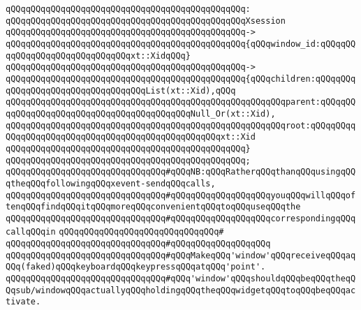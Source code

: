 \verb|qQQqqQQqqQQqqQQqqQQqqQQqqQQqqQQqqQQqqQQqqQQqqQQq:|\newline
\verb|qQQqqQQqqQQqqQQqqQQqqQQqqQQqqQQqqQQqqQQqqQQqqQQqXsession|\newline
\verb|qQQqqQQqqQQqqQQqqQQqqQQqqQQqqQQqqQQqqQQqqQQqqQQq->|\newline
\verb|qQQqqQQqqQQqqQQqqQQqqQQqqQQqqQQqqQQqqQQqqQQqqQQq{qQQqwindow_id:qQQqqQQqqQQqqQQqqQQqqQQqqQQqqQQqxt::XidqQQq}|\newline
\verb|qQQqqQQqqQQqqQQqqQQqqQQqqQQqqQQqqQQqqQQqqQQqqQQq->|\newline
\verb|qQQqqQQqqQQqqQQqqQQqqQQqqQQqqQQqqQQqqQQqqQQqqQQq{qQQqchildren:qQQqqQQqqQQqqQQqqQQqqQQqqQQqqQQqqQQqList(xt::Xid),qQQq|\newline
\verb|qQQqqQQqqQQqqQQqqQQqqQQqqQQqqQQqqQQqqQQqqQQqqQQqqQQqqQQqparent:qQQqqQQqqQQqqQQqqQQqqQQqqQQqqQQqqQQqqQQqqQQqNull_Or(xt::Xid),|\newline
\verb|qQQqqQQqqQQqqQQqqQQqqQQqqQQqqQQqqQQqqQQqqQQqqQQqqQQqqQQqroot:qQQqqQQqqQQqqQQqqQQqqQQqqQQqqQQqqQQqqQQqqQQqqQQqqQQqxt::Xid|\newline
\verb|qQQqqQQqqQQqqQQqqQQqqQQqqQQqqQQqqQQqqQQqqQQqqQQq}|\newline
\verb|qQQqqQQqqQQqqQQqqQQqqQQqqQQqqQQqqQQqqQQqqQQqqQQq;|\newline
\newline
\newline
\verb|qQQqqQQqqQQqqQQqqQQqqQQqqQQqqQQq#qQQqNB:qQQqRatherqQQqthanqQQqusingqQQqtheqQQqfollowingqQQqxevent-sendqQQqcalls,|\newline
\verb|qQQqqQQqqQQqqQQqqQQqqQQqqQQqqQQq#qQQqqQQqqQQqqQQqqQQqyouqQQqwillqQQqoftenqQQqfindqQQqitqQQqmoreqQQqconvenientqQQqtoqQQquseqQQqthe|\newline
\verb|qQQqqQQqqQQqqQQqqQQqqQQqqQQqqQQq#qQQqqQQqqQQqqQQqqQQqcorrespondingqQQqcallqQQqin|\newline
\verb|qQQqqQQqqQQqqQQqqQQqqQQqqQQqqQQq#|\newline
\verb|qQQqqQQqqQQqqQQqqQQqqQQqqQQqqQQq#qQQqqQQqqQQqqQQqqQQq|\newline
\newline
\newline
\verb|qQQqqQQqqQQqqQQqqQQqqQQqqQQqqQQq#qQQqMakeqQQq'window'qQQqreceiveqQQqaqQQq(faked)qQQqkeyboardqQQqkeypressqQQqatqQQq'point'.|\newline
\verb|qQQqqQQqqQQqqQQqqQQqqQQqqQQqqQQq#qQQq'window'qQQqshouldqQQqbeqQQqtheqQQqsub/windowqQQqactuallyqQQqholdingqQQqtheqQQqwidgetqQQqtoqQQqbeqQQqactivate.|\newline
